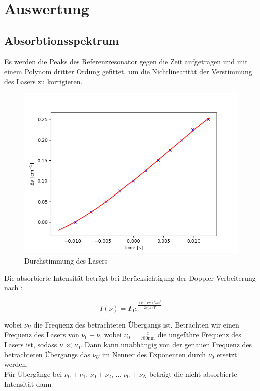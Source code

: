 \documentclass[a4paper,parskip]{scrartcl}
\begin{document}
\section{Auswertung}

\subsection{Absorbtionsspektrum}

Es werden die Peaks des Referenzresonator gegen die Zeit aufgetragen und mit einem Polynom dritter Ordung gefittet, um die Nichtlinearität der Verstimmung des Lasers zu korrigieren.

\begin{figure}[h]
\centering
\includegraphics[scale = 0.5]{./absorbtion/frequencyCorrection}
\caption{Durchstimmung des Lasers}
\end{figure}


Die absorbierte Intensität beträgt bei Berücksichtigung der Doppler-Verbeiterung nach \cite{Ref:3}:

$$I(\nu) = I_0 e^{\frac{(\nu-\nu_U)^2mc^2}{2\nu_U^2 k_B T}}$$

wobei $\nu_U$ die Frequenz des betrachteten Übergangs ist. Betrachten wir einen Frequenz des Lasers von $\nu_0+\nu$, wobei $\nu_0 = \frac{c}{780 \mathrm{ nm}}$ die ungefähre Frequenz des Lasers ist, sodass $\nu \ll \nu_0$. Dann kann unabhängig von der genauen Frequenz des betrachteten Übergangs das $\nu_U$ im Nenner des Exponenten durch $\nu_0$ ersetzt werden. \\

Für Übergänge bei $\nu_0 + \nu_1$, $\nu_0+\nu_2$, ... $\nu_0 + \nu_N$ beträgt die nicht absorbierte Intensität dann
\end{document}
